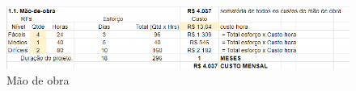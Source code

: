 \documentclass[
    12pt,               %
    openright,          %
    oneside,
    a4paper,            %
    BIBLATEX,           %
    TODO,               %
    english,            %
    brazil              %
    ]{ifsp-spo-inf-ctds}
\begin{document}

            
            
            \begin{figure}[H]
                \centering
                \includegraphics[width=1\textwidth]{images/Mao-de-obra.png}
                \caption{Mão de obra}
                \label{fig:infra}
            \end{figure}
            
\end{document}
